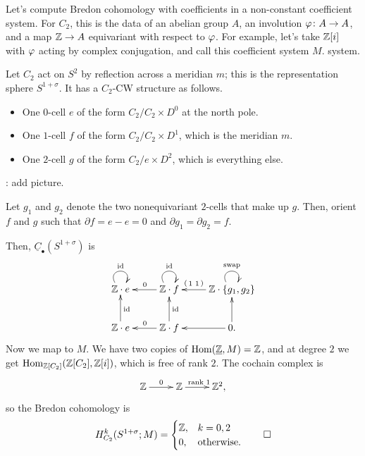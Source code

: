 \begin{exm}
Let's compute Bredon cohomology with coefficients in a non-constant coefficient system. For $C_2$, this is the data
of an abelian group $A$, an involution $\varphi\colon A\to A$, and a map $\mathbb Z\to A$ equivariant with respect to $\varphi$.
For example, let's take $\mathbb Z[i]$ with $\varphi$ acting by complex conjugation, and call this coefficient system $M$.
system.

Let $C_2$ act on $S^2$ by reflection across a meridian $m$; this is the representation sphere $S^{1+\sigma}$. It
has a
$C_2$-CW structure as follows.
\begin{itemize}
	\item One $0$-cell $e$ of the form $C_2/C_2\times D^0$ at the north pole.
	\item One $1$-cell $f$ of the form $C_2/C_2\times D^1$, which is the meridian $m$.
	\item One $2$-cell $g$ of the form $C_2/e\times D^2$, which is everything else.
\end{itemize}
\TODO: add picture.

Let $g_1$ and $g_2$ denote the two nonequivariant $2$-cells that make up $g$. Then, orient $f$ and $g$ such that
$\partial f = e - e = 0$ and $\partial g_1 = \partial g_2 = f$.

Then, $\underline C_\bullet(S^{1+\sigma})$ is
\[\xymatrix{
	\Z\cdot e\ar@(ul,ur)^\id & \Z\cdot f\ar@(ul,ur)^\id\ar[l]_0 & \Z\cdot\set{g_1,g_2} \ar@(ul,ur)^{\text{swap}}
	\ar[l]_-{\begin{psmallmatrix}1 & 1\end{psmallmatrix}}\\
	\Z\cdot e\ar[u]_\id & \Z\cdot f\ar[l]_0 \ar[u]_\id & 0.\ar[l]\ar[u]
}\]
Now we map to $M$. We have two copies of $\operatorname{Hom}(\underline{\mathbb Z}, M) = \mathbb Z$, and at degree $2$ we get
$\operatorname{Hom}_{\mathbb Z[C_2]}(\mathbb Z[C_2], \mathbb Z[i])$, which is free of rank $2$. The cochain complex is
\[\xymatrix{
	\Z\ar[r]^0 & \Z\ar[r]^{\text{rank }1} & \Z^2,
}\]
so the Bredon cohomology is
\[H_{C_2}^k(S^{1+\sigma}; M) = \begin{cases}
	\mathbb Z, &k = 0,2\\
	0, &\text{otherwise.}
\end{cases}\qedhere\]
\end{exm}

